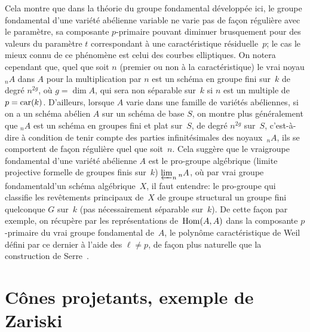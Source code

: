 Cela montre que dans la th\'eorie du groupe fondamental
d\'evelopp\'ee ici, le groupe fondamental d'une vari\'et\'e
ab\'elienne variable ne varie pas de fa\c con r\'eguli\`ere
avec le param\`etre, sa composante $p$-primaire pouvant diminuer
brusquement pour des valeurs du param\`etre $t$ correspondant \`a
une caract\'eristique r\'esiduelle~$p$; le cas le mieux connu de
ce ph\'enom\`ene est celui des courbes elliptiques. On notera
cependant que, quel que soit $n$ (premier ou non \`a la
caract\'eristique) le vrai noyau ${}_nA$ dans $A$ pour la
multiplication par $n$ est un sch\'ema en groupe fini sur~$k$ de
degr\'e $n^{2g}$, o\`u $g=\dim A$, qui sera non s\'eparable sur~$k$ si $n$ est un multiple de~$p=\operatorname{car}(k)$. D'ailleurs, lorsque $A$
varie dans une famille de vari\'et\'es ab\'eliennes, \ie si on
a un sch\'ema ab\'elien $A$ sur un sch\'ema de base $S$, on
montre plus g\'en\'eralement que ${}_n A$ est un sch\'ema en
groupes fini et plat sur~$S$, de degr\'e $n^{2g}$ sur~$S$,
c'est-\`a-dire \`a condition de tenir compte des parties
infinit\'esimales des noyaux~${}_n A$, ils se comportent de fa\c con r\'eguli\`ere quel que soit~$n$. Cela sugg\`ere que le
\og vrai\fg groupe fondamental d'une vari\'et\'e ab\'elienne $A$
est le pro-groupe alg\'ebrique (limite projective formelle de
groupes finis sur~$k$) $\varprojlim_n{{}_nA}$, o\`u
par \og vrai groupe fondamental\fg d'un sch\'ema alg\'ebrique~$X$, il
faut entendre: le pro-groupe qui classifie les rev\^etements
principaux de~$X$ de groupe structural un groupe fini quelconque $G$
sur~$k$ (pas n\'ecessairement s\'eparable sur~$k$). De cette
fa\c con par exemple, on r\'ecup\`ere par les
repr\'esentations de~$\operatorname{Hom}(A,A)$ dans la composante $p$-primaire du
vrai groupe fondamental de~$A$, le polyn\^ome caract\'eristique de
Weil d\'efini par ce dernier \`a l'aide des $\ell\neq p$, de fa\c con plus naturelle que la construction de Serre~\cite{XI.8}.

\section{C\^ones projetants, exemple de Zariski}
\label{XI.3}

